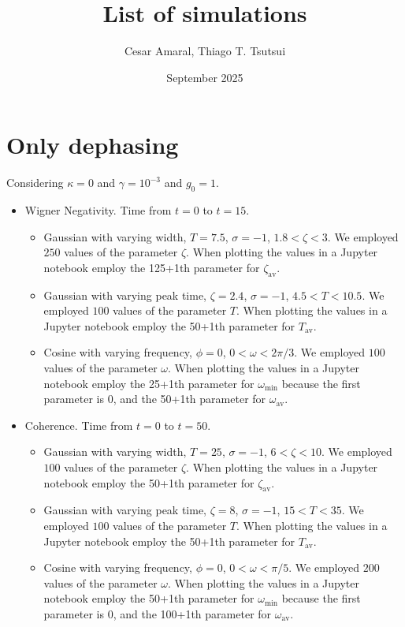\documentclass{article}
\title{List of simulations}
\author{Cesar Amaral, Thiago T. Tsutsui}
\date{September 2025}
\begin{document}
\maketitle

\section{Only dephasing}

Considering $\kappa=0$ and $\gamma=10^{-3}$ and $g_0=1$.

\begin{itemize}
    \item Wigner Negativity. Time from $t=0$ to $t=15$.
    \begin{itemize}
        \item Gaussian with varying width, $T=7.5$, $\sigma=-1$, $1.8<\zeta<3$. We employed $250$ values of the parameter $\zeta$.
        When plotting the values in a Jupyter notebook employ the 125+1th parameter for $\zeta_{\text{av}}$.
        \item Gaussian with varying peak time, $\zeta=2.4$, $\sigma=-1$, $4.5<T<10.5$. We employed $100$ values of the parameter $T$.
        When plotting the values in a Jupyter notebook employ the 50+1th parameter for $T_{\text{av}}$.
        \item Cosine with varying frequency, $\phi=0$, $0<\omega<2\pi/3$. We employed $100$ values of the parameter $\omega$.
        When plotting the values in a Jupyter notebook employ the 25+1th parameter for $\omega_{\text{min}}$ because the first parameter is $0$, and the 50+1th parameter for $\omega_{\text{av}}$.
    \end{itemize}
    \item Coherence. Time from $t=0$ to $t=50$.
    \begin{itemize}
        \item Gaussian with varying width, $T=25$, $\sigma=-1$, $6<\zeta<10$. We employed $100$ values of the parameter $\zeta$.
        When plotting the values in a Jupyter notebook employ the 50+1th parameter for $\zeta_{\text{av}}$.
        \item Gaussian with varying peak time, $\zeta=8$, $\sigma=-1$, $15<T<35$. We employed $100$ values of the parameter $T$.
        When plotting the values in a Jupyter notebook employ the 50+1th parameter for $T_{\text{av}}$.
        \item Cosine with varying frequency, $\phi=0$, $0<\omega<\pi/5$. We employed $200$ values of the parameter $\omega$.
        When plotting the values in a Jupyter notebook employ the 50+1th parameter for $\omega_{\text{min}}$ because the first parameter is $0$, and the 100+1th parameter for $\omega_{\text{av}}$.

\end{itemize}
\end{itemize}
\end{document}
